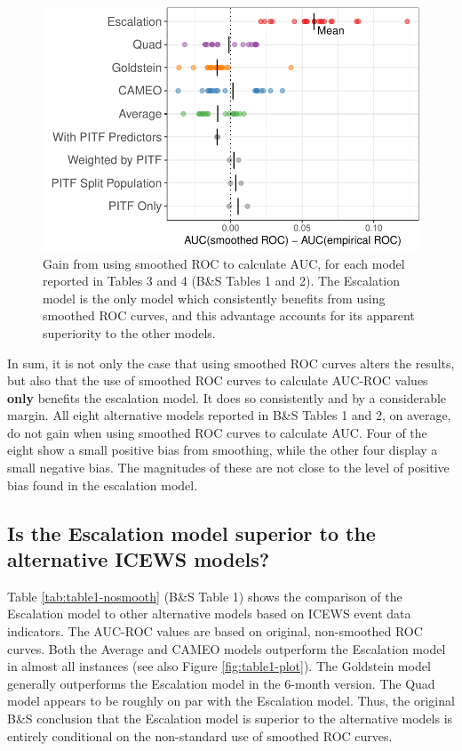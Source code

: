 \documentclass[
]{article}
\begin{document}
\begin{figure}

{\centering \includegraphics[width=.8\linewidth]{paper_files/figure-latex/benefit-plot-1} 

}

\caption{Gain from using smoothed ROC to calculate AUC, for each model reported in Tables 3 and 4 (B\&S Tables 1 and 2). The Escalation model is the only model which consistently benefits from using smoothed ROC curves, and this advantage accounts for its apparent superiority to the other models.}\label{fig:benefit-plot}
\end{figure}

In sum, it is not only the case that using smoothed ROC curves alters the results, but also that the use of smoothed ROC curves to calculate AUC-ROC values \textbf{only} benefits the escalation model. It does so consistently and by a considerable margin. All eight alternative models reported in B\&S Tables 1 and 2, on average, do not gain when using smoothed ROC curves to calculate AUC. Four of the eight show a small positive bias from smoothing, while the other four display a small negative bias. The magnitudes of these are not close to the level of positive bias found in the escalation model.

\hypertarget{is-the-escalation-model-superior-to-the-alternative-icews-models}{%
\subsection{Is the Escalation model superior to the alternative ICEWS models?}\label{is-the-escalation-model-superior-to-the-alternative-icews-models}}

Table \ref{tab:table1-nosmooth} (B\&S Table 1) shows the comparison of the Escalation model to other alternative models based on ICEWS event data indicators. The AUC-ROC values are based on original, non-smoothed ROC curves. Both the Average and CAMEO models outperform the Escalation model in almost all instances (see also Figure \ref{fig:table1-plot}). The Goldstein model generally outperforms the Escalation model in the 6-month version. The Quad model appears to be roughly on par with the Escalation model. Thus, the original B\&S conclusion that the Escalation model is superior to the alternative models is entirely conditional on the non-standard use of smoothed ROC curves.
\end{document}
